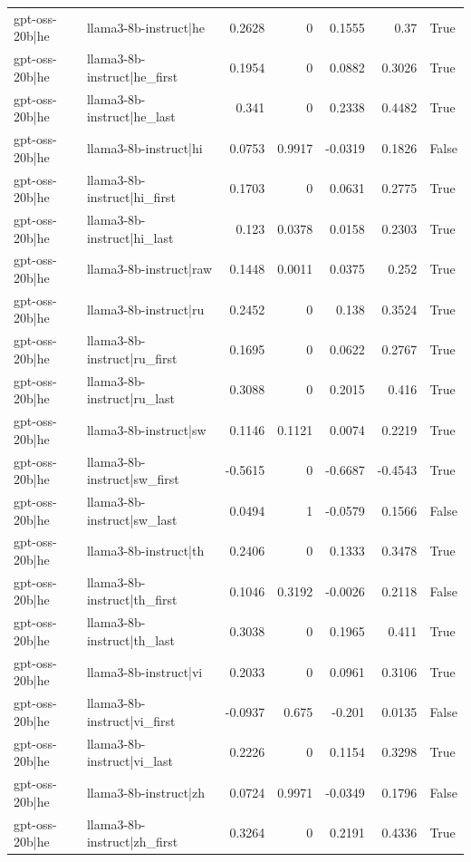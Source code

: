 \begin{table}
\begin{tabular}{l l r r r r l}
gpt-oss-20b|he & llama3-8b-instruct|he & 0.2628 & 0 & 0.1555 & 0.37 & True \\
gpt-oss-20b|he & llama3-8b-instruct|he_first & 0.1954 & 0 & 0.0882 & 0.3026 & True \\
gpt-oss-20b|he & llama3-8b-instruct|he_last & 0.341 & 0 & 0.2338 & 0.4482 & True \\
gpt-oss-20b|he & llama3-8b-instruct|hi & 0.0753 & 0.9917 & -0.0319 & 0.1826 & False \\
gpt-oss-20b|he & llama3-8b-instruct|hi_first & 0.1703 & 0 & 0.0631 & 0.2775 & True \\
gpt-oss-20b|he & llama3-8b-instruct|hi_last & 0.123 & 0.0378 & 0.0158 & 0.2303 & True \\
gpt-oss-20b|he & llama3-8b-instruct|raw & 0.1448 & 0.0011 & 0.0375 & 0.252 & True \\
gpt-oss-20b|he & llama3-8b-instruct|ru & 0.2452 & 0 & 0.138 & 0.3524 & True \\
gpt-oss-20b|he & llama3-8b-instruct|ru_first & 0.1695 & 0 & 0.0622 & 0.2767 & True \\
gpt-oss-20b|he & llama3-8b-instruct|ru_last & 0.3088 & 0 & 0.2015 & 0.416 & True \\
gpt-oss-20b|he & llama3-8b-instruct|sw & 0.1146 & 0.1121 & 0.0074 & 0.2219 & True \\
gpt-oss-20b|he & llama3-8b-instruct|sw_first & -0.5615 & 0 & -0.6687 & -0.4543 & True \\
gpt-oss-20b|he & llama3-8b-instruct|sw_last & 0.0494 & 1 & -0.0579 & 0.1566 & False \\
gpt-oss-20b|he & llama3-8b-instruct|th & 0.2406 & 0 & 0.1333 & 0.3478 & True \\
gpt-oss-20b|he & llama3-8b-instruct|th_first & 0.1046 & 0.3192 & -0.0026 & 0.2118 & False \\
gpt-oss-20b|he & llama3-8b-instruct|th_last & 0.3038 & 0 & 0.1965 & 0.411 & True \\
gpt-oss-20b|he & llama3-8b-instruct|vi & 0.2033 & 0 & 0.0961 & 0.3106 & True \\
gpt-oss-20b|he & llama3-8b-instruct|vi_first & -0.0937 & 0.675 & -0.201 & 0.0135 & False \\
gpt-oss-20b|he & llama3-8b-instruct|vi_last & 0.2226 & 0 & 0.1154 & 0.3298 & True \\
gpt-oss-20b|he & llama3-8b-instruct|zh & 0.0724 & 0.9971 & -0.0349 & 0.1796 & False \\
gpt-oss-20b|he & llama3-8b-instruct|zh_first & 0.3264 & 0 & 0.2191 & 0.4336 & True \\

\end{tabular}
\end{table}

